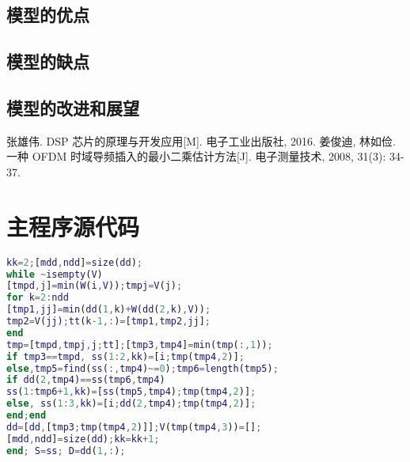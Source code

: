 \documentclass[a4paper,10pt]{my_paper}
\numberwithin{equation}{section}
\begin{document}
\subsection{模型的优点}

\subsection{模型的缺点}

\subsection{模型的改进和展望}

\begin{thebibliography}{10}
张雄伟. DSP 芯片的原理与开发应用[M]. 电子工业出版社, 2016.
姜俊迪, 林如俭. 一种 OFDM 时域导频插入的最小二乘估计方法[J]. 电子测量技术, 2008, 31(3): 34-37.

\end{thebibliography}

\newpage

\appendix

\section{主程序源代码}

\begin{lstlisting}[language=Matlab]%设置不同语言即可。
kk=2;[mdd,ndd]=size(dd);
while ~isempty(V)
[tmpd,j]=min(W(i,V));tmpj=V(j);
for k=2:ndd
[tmp1,jj]=min(dd(1,k)+W(dd(2,k),V));
tmp2=V(jj);tt(k-1,:)=[tmp1,tmp2,jj];
end
tmp=[tmpd,tmpj,j;tt];[tmp3,tmp4]=min(tmp(:,1));
if tmp3==tmpd, ss(1:2,kk)=[i;tmp(tmp4,2)];
else,tmp5=find(ss(:,tmp4)~=0);tmp6=length(tmp5);
if dd(2,tmp4)==ss(tmp6,tmp4)
ss(1:tmp6+1,kk)=[ss(tmp5,tmp4);tmp(tmp4,2)];
else, ss(1:3,kk)=[i;dd(2,tmp4);tmp(tmp4,2)];
end;end
dd=[dd,[tmp3;tmp(tmp4,2)]];V(tmp(tmp4,3))=[];
[mdd,ndd]=size(dd);kk=kk+1;
end; S=ss; D=dd(1,:);
 \end{lstlisting}
\end{document}
